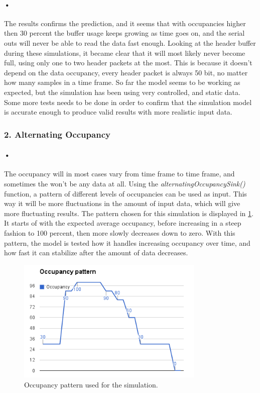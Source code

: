 \documentclass[a4paper, 12pt]{report}
\begin{document}
\paragraph{•} %
The results confirms the prediction, and it seems that with occupancies higher then 30 percent the buffer usage keeps growing as time goes on, and the serial outs will never be able to read the data fast enough.
Looking at the header buffer during these simulations, it became clear that it will most likely never become full, using only one to two header packets at the most.
This is because it doesn't depend on the data occupancy, every header packet is always 50 bit, no matter how many samples in a time frame.
So far the model seems to be working as expected, but the simulation has been using very controlled, and static data.
Some more tests needs to be done in order to confirm that the simulation model is accurate enough to produce valid results with more realistic input data.

\subsubsection{2. Alternating Occupancy}

\paragraph{•} %
The occupancy will in most cases vary from time frame to time frame, and sometimes the won't be any data at all.
Using the \textit{alternatingOccupancySink()} function, a pattern of different levels of occupancies can be used as input.
This way it will be more fluctuations in the amount of input data, which will give more fluctuating results.
The pattern chosen for this simulation is displayed in \ref{fig:occ-pattern}.
It starts of with the expected average occupancy, before increasing in a steep fashion to 100 percent, then more slowly decreases down to zero.
With this pattern, the model is tested how it handles increasing occupancy over time, and how fast it can stabilize after the amount of data decreases.

\begin{figure}[h!]
	\centering
		\includegraphics[width=0.8\textwidth]{images/occ-pattern.png}
		\caption{Occupancy pattern used for the simulation.}
		\label{fig:occ-pattern}
\end{figure}
\end{document}
